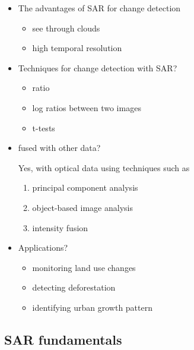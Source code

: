 \documentclass[
  letterpaper,
  DIV=11,
  numbers=noendperiod]{scrreprt}
\providecommand{\tightlist}{%
  \setlength{\itemsep}{0pt}\setlength{\parskip}{0pt}}\usepackage{longtable,booktabs,array}
\begin{document}
\begin{itemize}
\item
  The advantages of SAR for change detection

  \begin{itemize}
  \tightlist
  \item
    see through clouds
  \item
    high temporal resolution
  \end{itemize}
\item
  Techniques for change detection with SAR?

  \begin{itemize}
  \tightlist
  \item
    ratio
  \item
    log ratios between two images
  \item
    t-tests
  \end{itemize}
\item
  fused with other data?

  Yes, with optical data using techniques such as

  \begin{enumerate}
  \def\labelenumi{\arabic{enumi}.}
  \tightlist
  \item
    principal component analysis
  \item
    object-based image analysis
  \item
    intensity fusion
  \end{enumerate}
\item
  Applications?

  \begin{itemize}
  \tightlist
  \item
    monitoring land use changes
  \item
    detecting deforestation
  \item
    identifying urban growth pattern
  \end{itemize}
\end{itemize}

\hypertarget{sar-fundamentals}{%
\subsection{SAR fundamentals}\label{sar-fundamentals}}
\end{document}
